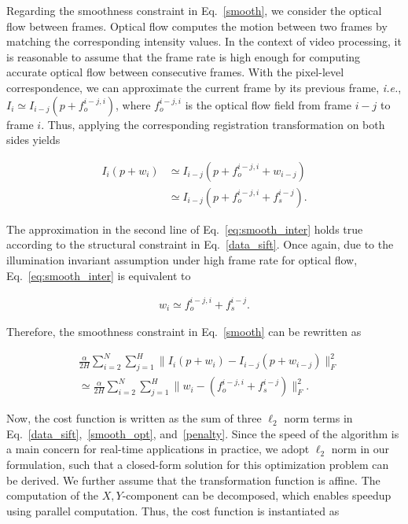 \documentclass[10pt,journal]{IEEEtran}
\begin{document}
Regarding the smoothness constraint in Eq.~\eqref{smooth}, we consider the optical flow between frames. Optical flow computes the motion between two frames by matching the corresponding intensity values. In the context of video processing, it is reasonable to assume that the frame rate is high enough for computing accurate optical flow between consecutive frames. With the pixel-level correspondence, we can approximate the current frame by its previous frame, \textit{i.e.}, $I_i\simeq I_{i-j}(p+f_o^{i-j,i})$, where $f_o^{i-j,i}$ is the optical flow field from frame $i-j$ to frame $i$. Thus, applying the corresponding registration transformation on both sides yields

\begin{equation}
\begin{aligned}
\label{eq:smooth_inter}
I_i(p+w_i)& \simeq I_{i-j}(p+f_o^{i-j,i}+w_{i-j}) \\
					& \simeq I_{i-j}(p+f_o^{i-j,i}+f_s^{i-j}).
\end{aligned}
\end{equation}

The approximation in the second line of Eq.~\eqref{eq:smooth_inter} holds true according to the structural constraint in Eq.~\eqref{data_sift}. Once again, due to the illumination invariant assumption under high frame rate for optical flow, Eq.~\eqref{eq:smooth_inter} is equivalent to

\begin{equation}
\begin{aligned}
w_i \simeq f_o^{i-j,i}+f_s^{i-j}.
\end{aligned}
\end{equation}

Therefore, the smoothness constraint in Eq.~\eqref{smooth} can be rewritten as

\begin{equation}
\begin{aligned}
\label{smooth_opt}
&\frac{\alpha}{2H}\sum_{i=2}^{N}\sum_{j=1}^{H}\parallel{I_i(p+w_i)-I_{i-j}(p+w_{i-j})}\parallel_F^2 \\
&\simeq\frac{\alpha}{2H}\sum_{i=2}^{N}\sum_{j=1}^{H}\parallel{w_i-(f_o^{i-j,i}+f_s^{i-j})}\parallel_F^2.
\end{aligned}
\end{equation}


Now, the cost function is written as the sum of three $\ell_2$ norm terms in Eq.~\eqref{data_sift},~\eqref{smooth_opt}, and~\eqref{penalty}. Since the speed of the algorithm is a main concern for real-time applications in practice, we adopt $\ell_2$ norm in our formulation, such that a closed-form solution for this optimization problem can be derived. We further assume that the transformation function is affine. The computation of the $X,Y$-component can be decomposed, which enables speedup using parallel computation. Thus, the cost function is instantiated as
\end{document}
